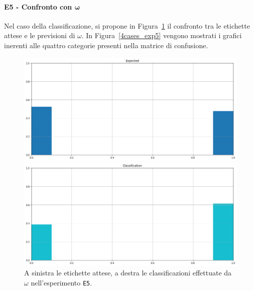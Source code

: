 \documentclass[12pt]{report}
\theoremstyle{definition}
\begin{document}
\paragraph{E5 - Confronto con $\bm{\omega}$}
Nel caso della classificazione, si propone in Figura~\ref{classification_exp5} il confronto tra le etichette attese e le previsioni di $\omega$. 
In Figura~\ref{4cases_exp5} vengono mostrati i grafici inerenti alle quattro categorie presenti nella matrice di confusione.
\begin{figure}
\centering
    \begin{minipage}{0.48\textwidth}
        \includegraphics[width=\linewidth]{images/experiment_beta5_sovrapposti/expected_classification.png}
    \end{minipage}
    \begin{minipage}{0.48\textwidth}
        \includegraphics[width=\linewidth]{images/experiment_beta5_sovrapposti/prediction_classification.png}
    \end{minipage}
    \caption{A sinistra le etichette attese, a destra le classificazioni effettuate da $\omega$ nell'esperimento \texttt{E5}.}
    \label{classification_exp5}
\end{figure}
\end{document}

